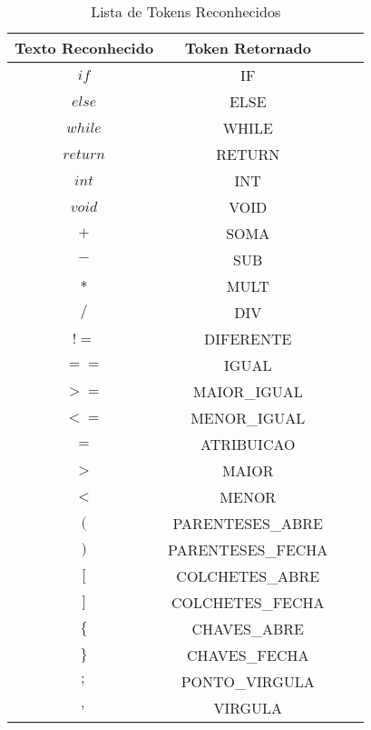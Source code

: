 \begin{table}[!htb]
	\centering
	\caption{ Lista de Tokens Reconhecidos}
	\label{tb:tokens}
	
	\begin{tabular}{|c|c|c|c|}
		
		\hline
		\textbf{Texto Reconhecido} & \textbf{Token Retornado}\\
		\hline
		
		
		$if$		  		 &                          IF\\
		\hline
		$else$  	   		 &                          ELSE\\
		\hline
		$while$		     &	                        WHILE\\
		\hline
		$return$			 &	                        RETURN\\
		\hline
		$int$			     &	                        INT\\
		\hline
		$void$			 &		                    VOID\\
		\hline
		$+$				 &		                    SOMA\\
		\hline
		$-$				 &		                    SUB\\
		\hline
		$*$				 &		                    MULT\\
		\hline
		$/$				 &		                    DIV\\
		\hline
		$!=$               &                          DIFERENTE\\
		\hline
		$==$				 &                          IGUAL\\
		\hline
		$>=$			     &                          MAIOR\_IGUAL\\
		\hline
		$<=$				 &                          MENOR\_IGUAL\\
		\hline
		$=$				 &	                        ATRIBUICAO\\
		\hline
		$>$				 &		                    MAIOR\\
		\hline
		$<$				 &		                    MENOR\\
		\hline
		$($				 &		                    PARENTESES\_ABRE\\
		\hline
		$)$				 &		                    PARENTESES\_FECHA\\
		\hline
		$[$				 &		                    COLCHETES\_ABRE\\
		\hline
		$]$				 &		                    COLCHETES\_FECHA\\
		\hline
		$\{$				 &	                        CHAVES\_ABRE\\
		\hline
		$\}$				 &		                    CHAVES\_FECHA\\
		\hline
		$;$				 &		                    PONTO\_VIRGULA\\
		\hline
		$,$                &                          VIRGULA\\
		\hline
		

\end{tabular}
\end{table}

